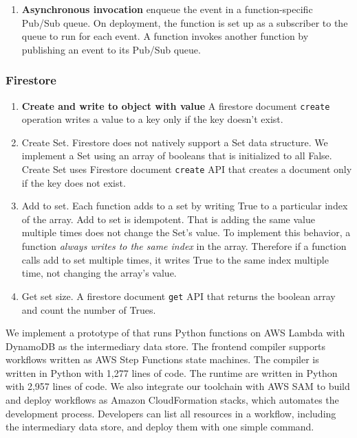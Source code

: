 \begin{enumerate}
  \item \textbf{Asynchronous invocation} enqueue the event in a function-specific Pub/Sub queue. On deployment, the function is set up as a subscriber to the queue to run for each event. A function invokes another function by publishing an event to its Pub/Sub queue.
\end{enumerate}

\subsubsection{Firestore}

\begin{enumerate}
  \item \textbf{Create and write to object with value} A firestore document \texttt{create} operation writes a value to a key only if the key doesn't exist.
  \item Create Set. Firestore does not natively support a Set data structure. We implement a Set using an array of booleans that is initialized to all False. Create Set uses Firestore document \texttt{create} API that creates a document only if the key does not exist.
  \item Add to set. Each function adds to a set by writing True to a particular index of the array. Add to set is idempotent. That is adding the same value multiple times does not change the Set's value. To implement this behavior, a function \emph{always writes to the same index} in the array. Therefore if a function calls add to set multiple times, it writes True to the same index multiple time, not changing the array's value.
  \item Get set size. A firestore document \texttt{get} API that returns the boolean array and count the number of Trues.
\end{enumerate}


We implement a prototype of \name{} that runs Python functions on AWS Lambda
with DynamoDB as the intermediary data store. The frontend compiler
supports workflows written as AWS Step Functions state machines. The compiler
is written in Python with 1,277 lines of code.
The runtime are written in Python with 2,957 lines of code. We also integrate
our toolchain with AWS SAM to build and deploy \name{} workflows as Amazon
CloudFormation stacks, which automates the development process. Developers can
list all resources in a workflow, including the intermediary data store, and
deploy them with one simple command.


